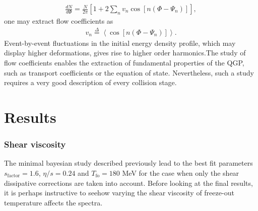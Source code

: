 \begin{align*}
    \frac{dN}{d\Phi}=\frac{N}{2 \pi} \left[1+2 \sum_{n} v_{n} \cos \left[n\left(\Phi-\Psi_{n}\right)\right]\right],
\end{align*}
one may extract flow coefficients as
\begin{align*}
    v_{n}\overset{\Delta}{=}\left\langle\cos \left[n\left(\Phi-\Psi_{n}\right)\right]\right\rangle.
\end{align*}
Event-by-event fluctuations in the initial energy density profile, which may display higher deformations, gives rise to higher order harmonics.The study of flow coefficients enables the extraction of fundamental properties of the {\sffamily QGP}, such as transport coefficients or the equation of state. Nevertheless, such a study requires a very good description of every collision stage.

\section{Results}
\subsubsection*{Shear viscosity}
The minimal bayesian study described previously lead to the best fit parameters $s_\text{factor}=1.6$, $\eta/s=0.24$ and $T_\text{fo}=180$ MeV for the case when only the shear dissipative corrections are taken into account. Before looking at the final results, it is perhaps instructive to seehow varying the shear viscosity of freeze-out temperature affects the spectra. 

